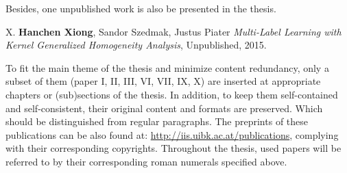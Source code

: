 Besides, one unpublished work is also be presented in the thesis.   
\begin{shaded}
 {\Huge X.} \textbf{Hanchen Xiong}, Sandor Szedmak, Justus Piater {\it Multi-Label Learning with Kernel Generalized Homogeneity Analysis}, 
Unpublished, 2015.
\end{shaded}
To fit the main theme of the thesis and minimize content redundancy, only a subset of them (paper I, II, III, VI, VII, IX, X) are inserted at appropriate chapters or (sub)sections of the thesis. 
In addition, to keep them self-contained and self-consistent,     
their original content and formats are preserved.   
Which should be distinguished from regular paragraphs. The preprints of these publications can be also found at: \url{http://iis.uibk.ac.at/publications}, 
complying with their corresponding copyrights. 
Throughout the thesis, used papers will be referred to by their corresponding roman numerals specified above. 

